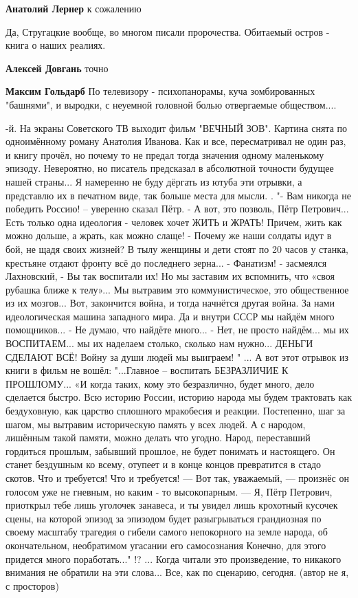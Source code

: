 \begin{itemize}
\textbf{Анатолий Лернер} к сожалению


Да, Стругацкие вообще, во многом писали пророчества. Обитаемый остров - книга о
наших реалиях.

\begin{itemize} %
\textbf{Алексей Довгань} точно

\textbf{Максим Гольдарб} По телевизору - психопанорамы, куча зомбированных "башнями", и выродки, с неуемной головной болью отвергаемые обществом....
\end{itemize} %


-й.
На экраны Советского ТВ выходит фильм "ВЕЧНЫЙ ЗОВ".
Картина снята по одноимённому роману Анатолия Иванова.
Как и все, пересматривал не один раз, и книгу прочёл, но почему то не предал тогда значения одному маленькому эпизоду.
Невероятно, но писатель предсказал в абсолютной точности будущее нашей страны...
Я намеренно не буду дёргать из ютуба эти отрывки, а представлю их в печатном виде, так больше места для мысли.
.
"- Вам никогда не победить Россию! – уверенно сказал Пётр.
- А вот, это позволь, Пётр Петрович... Есть только одна идеология - человек хочет ЖИТЬ и ЖРАТЬ! Причем, жить как можно дольше, а жрать, как можно слаще!
- Почему же наши солдаты идут в бой, не щадя своих жизней? В тылу женщины и дети стоят по 20 часов у станка, крестьяне отдают фронту всё до последнего зерна...
- Фанатизм! - засмеялся Лахновский, - Вы так воспитали их! Но мы заставим их вспомнить, что «своя рубашка ближе к телу»... Мы вытравим это коммунистическое, это общественное из их мозгов... Вот, закончится война, и тогда начнётся другая война. За нами идеологическая машина западного мира. Да и внутри СССР мы найдём много помощников...
- Не думаю, что найдёте много...
- Нет, не просто найдём... мы их ВОСПИТАЕМ... мы их наделаем столько, сколько нам нужно... ДЕНЬГИ СДЕЛАЮТ ВСЁ! Войну за души людей мы выиграем! "
...
А вот этот отрывок из книги в фильм не вошёл:
"...Главное – воспитать БЕЗРАЗЛИЧИЕ К ПРОШЛОМУ... «И когда таких, кому это безразлично, будет много, дело сделается быстро. Всю историю России, историю народа мы будем трактовать как бездуховную, как царство сплошного мракобесия и реакции. Постепенно, шаг за шагом, мы вытравим историческую память у всех людей. А с народом, лишённым такой памяти, можно делать что угодно. Народ, переставший гордиться прошлым, забывший прошлое, не будет понимать и настоящего. Он станет бездушным ко всему, отупеет и в конце концов превратится в стадо скотов. Что и требуется! Что и требуется! — Вот так, уважаемый, — произнёс он голосом уже не гневным, но каким - то высокопарным. — Я, Пётр Петрович, приоткрыл тебе лишь уголочек занавеса, и ты увидел лишь крохотный кусочек сцены, на которой эпизод за эпизодом будет разыгрываться грандиозная по своему масштабу трагедия о гибели самого непокорного на земле народа, об окончательном, необратимом угасании его самосознания Конечно, для этого придется много поработать..." !?
...
Когда читали это произведение, то никакого внимания не обратили на эти слова... Все, как по сценарию, сегодня.
(автор не я, с просторов)
\restorecr


\end{itemize}
